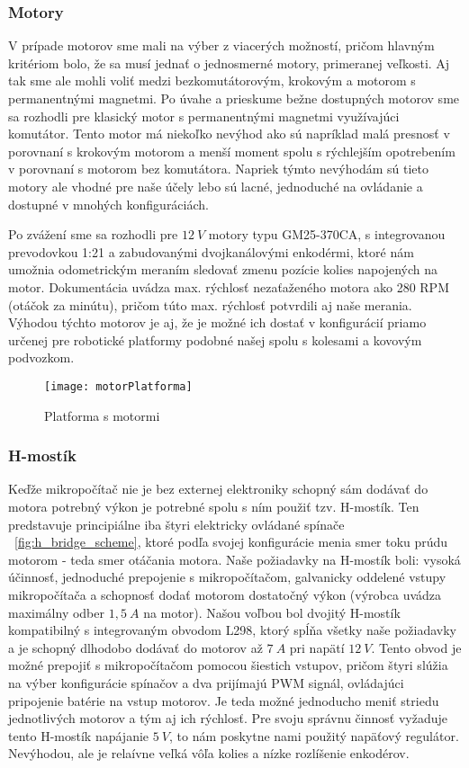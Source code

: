 \subsubsection{Motory}
V prípade motorov sme mali na výber z viacerých možností, pričom hlavným kritériom bolo, že sa musí jednať o jednosmerné motory, primeranej veľkosti. Aj tak sme ale mohli voliť medzi bezkomutátorovým, krokovým a motorom s permanentnými magnetmi. Po úvahe a prieskume bežne dostupných motorov sme sa rozhodli pre klasický motor s permanentnými magnetmi využívajúci komutátor. Tento motor má niekoľko nevýhod ako sú napríklad malá presnosť v porovnaní s krokovým motorom a menší moment spolu s rýchlejším opotrebením v porovnaní s motorom bez komutátora. Napriek týmto nevýhodám sú tieto motory ale vhodné pre naše účely lebo sú lacné, jednoduché na ovládanie a dostupné v mnohých konfiguráciách. 

Po zvážení sme sa rozhodli pre $12~V$ motory typu GM25-370CA, s integrovanou prevodovkou 1:21 a zabudovanými dvojkanálovými enkodérmi, ktoré nám umožnia odometrickým meraním sledovať zmenu pozície kolies napojených na motor. Dokumentácia uvádza max. rýchlosť nezaťaženého motora ako 280 \ac{RPM} (otáčok za minútu), pričom túto max. rýchlosť potvrdili aj naše merania. Výhodou týchto motorov je aj, že je možné ich dostať v konfigurácií priamo určenej pre robotické platformy podobné našej spolu s kolesami a kovovým podvozkom. 


\begin{figure}[h]
\centering
\texttt{[image: motorPlatforma]}
\caption{Platforma s motormi}
\label{fig:motorPlatforma}
\end{figure}

\subsubsection{H-mostík}
Keďže mikropočítač nie je bez externej elektroniky schopný sám dodávať do motora potrebný výkon je potrebné spolu s ním použiť tzv. H-mostík. Ten predstavuje principiálne iba štyri elektricky ovládané spínače \figurename~\ref{fig:h_bridge_scheme}, ktoré podľa svojej konfigurácie menia smer toku prúdu motorom - teda smer otáčania motora. Naše požiadavky na H-mostík boli: vysoká účinnosť, jednoduché prepojenie s mikropočítačom, galvanicky oddelené vstupy mikropočítača a schopnosť dodať motorom dostatočný výkon (výrobca uvádza maximálny odber $1,5~A$ na motor). 
Našou voľbou bol dvojitý H-mostík kompatibilný s integrovaným obvodom L298, ktorý spĺňa všetky naše požiadavky a je schopný dlhodobo dodávať do motorov až $7~A$ pri napätí $12~V$. Tento obvod je možné prepojiť s mikropočítačom pomocou šiestich vstupov, pričom štyri slúžia na výber konfigurácie spínačov a dva prijímajú \ac{PWM} signál, ovládajúci pripojenie batérie na vstup motorov. Je teda možné jednoducho meniť striedu jednotlivých motorov a tým aj ich rýchlosť. Pre svoju správnu činnosť vyžaduje tento H-mostík napájanie $5~V$, to nám poskytne nami použitý napäťový regulátor. Nevýhodou, ale je relaívne veľká vôľa kolies a nízke rozlíšenie enkodérov.  

